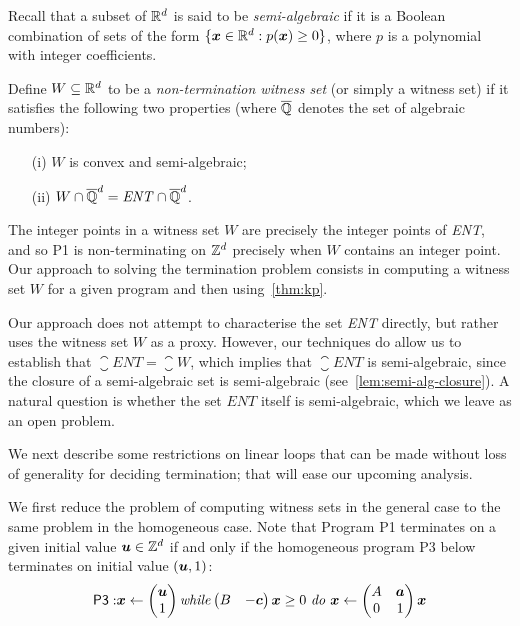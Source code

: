 Recall that a subset of $\mathbb{R}^{d}$ is said to be
\emph{semi-algebraic} if it is a Boolean combination of sets of the
form $\lbrace \boldsymbol{x} \in \mathbb{R}^{d} : p(\boldsymbol{x})\geq 0\rbrace$,
where $p$ is a polynomial with integer coefficients.

Define $W \subseteq \mathbb{R}^{d}$ to be a
\emph{non-termination witness set} (or simply a witness set) if it
satisfies the following two properties (where $\overline{\mathbb{Q}}$ denotes the
set of algebraic numbers):
\begin{itemize}
\item[(i)] $W$ is convex and semi-algebraic;
\item[(ii)] $W\cap \overline{\mathbb{Q}}^{d}=\mathit{ENT}\cap \overline{\mathbb{Q}}^{d}$.
\end{itemize}

The integer points in a witness set $W$ are precisely the integer
points of \textit{ENT}, and so \textsf{P1} is non-terminating on
$\mathbb{Z}^{d}$ precisely when $W$ contains an integer point.  Our
approach to solving the termination problem consists in computing a
witness set $W$ for a given program and then using~\cref{thm:kp}.

Our approach does not attempt to characterise the set \textit{ENT}
directly, but rather uses the witness set $W$ as a proxy. However, our
techniques do allow us to establish that
$\closure{\mathit{ENT}}=\closure{W}$, which implies
that $\closure{\mathit{ENT}}$ is semi-algebraic, since the closure of
a semi-algebraic set is semi-algebraic (see~\cref{lem:semi-alg-closure}). A natural question is whether the set $ENT$
itself is semi-algebraic, which we leave as an open problem.

We next describe some restrictions on linear loops that can
be made without loss of generality for deciding termination;
that will ease our upcoming analysis.

We first reduce the problem of computing witness sets in the general
case to the same problem in the homogeneous case.  Note that Program
\textsf{P1} terminates on a given initial value $\boldsymbol{u}\in
\mathbb{Z}^{d}$ if and only if the homogeneous program \textsf{P3} below
terminates on initial value $(\boldsymbol{u}, 1)$:
\begin{align*}
\mathsf{P3:} \boldsymbol{x}\gets
\begin{pmatrix} \boldsymbol{u}\\ 1\end{pmatrix} \mbox{\textit{while}} \begin{pmatrix}B &-\boldsymbol{c} \end{pmatrix}
\boldsymbol{x} \geq 0 \mbox{ \textit{do} } \boldsymbol{x}\leftarrow
\begin{pmatrix}A&\boldsymbol{a}\\ 0 & 1
\end{pmatrix} \boldsymbol{x}
\end{align*}


